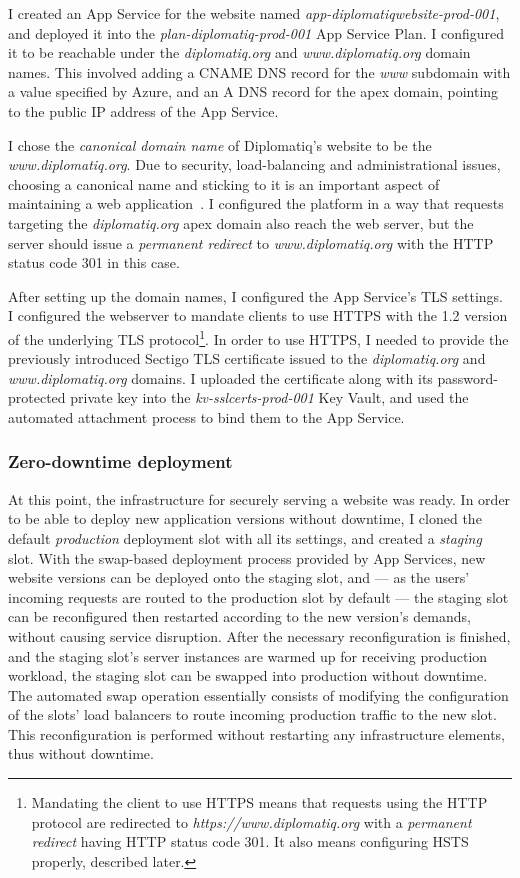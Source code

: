 I created an App Service for the website named \emph{app-diplomatiqwebsite-prod-001}, and deployed it into the \emph{plan-diplomatiq-prod-001} App Service Plan. I configured it to be reachable under the \emph{diplomatiq.org} and \emph{www.diplomatiq.org} domain names. This involved adding a CNAME DNS record for the \emph{www} subdomain with a value specified by Azure, and an A DNS record for the apex domain, pointing to the public IP address of the App Service.

I chose the \emph{canonical domain name} of Diplomatiq's website to be the \emph{www.diplomatiq.org}. Due to security, load-balancing and administrational issues, choosing a canonical name and sticking to it is an important aspect of maintaining a web application~\cite{mdn-canonical-domain, bjorn-canonical-domain}. I configured the platform in a way that requests targeting the \emph{diplomatiq.org} apex domain also reach the web server, but the server should issue a \emph{permanent redirect} to \emph{www.diplomatiq.org} with the HTTP status code 301 in this case.

After setting up the domain names, I configured the App Service's TLS settings. I configured the webserver to mandate clients to use HTTPS with the 1.2 version of the underlying TLS protocol\footnote{Mandating the client to use HTTPS means that requests using the HTTP protocol are redirected to \emph{https://www.diplomatiq.org} with a \emph{permanent redirect} having HTTP status code 301. It also means configuring HSTS properly, described later.}. In order to use HTTPS, I needed to provide the previously introduced Sectigo TLS certificate issued to the \emph{diplomatiq.org} and \emph{www.diplomatiq.org} domains. I uploaded the certificate along with its password-protected private key into the \emph{kv-sslcerts-prod-001} Key Vault, and used the automated attachment process to bind them to the App Service.

\subsubsection{Zero-downtime deployment}

At this point, the infrastructure for securely serving a website was ready. In order to be able to deploy new application versions without downtime, I cloned the default \emph{production} deployment slot with all its settings, and created a \emph{staging} slot. With the swap-based deployment process provided by App Services, new website versions can be deployed onto the staging slot, and — as the users' incoming requests are routed to the production slot by default — the staging slot can be reconfigured then restarted according to the new version's demands, without causing service disruption. After the necessary reconfiguration is finished, and the staging slot's server instances are warmed up for receiving production workload, the staging slot can be swapped into production without downtime. The automated swap operation essentially consists of modifying the configuration of the slots' load balancers to route incoming production traffic to the new slot. This reconfiguration is performed without restarting any infrastructure elements, thus without downtime.

